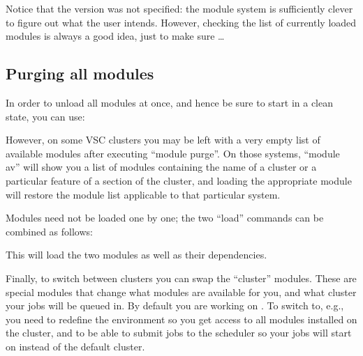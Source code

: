 Notice that the version was not specified: the module system is sufficiently
clever to figure out what the user intends. However, checking the list of
currently loaded modules is always a good idea, just to make sure \ldots

\subsection{Purging all modules}
\label{subsec:purging-modules}

In order to unload all modules at once, and hence be sure to start in a clean
state, you can use:

\begin{prompt}
\end{prompt}

However, on some VSC clusters you may be left with a very empty list of available
modules after executing ``module purge''. On those systems, ``module av'' will show you a list of
modules containing the name of a cluster or a particular feature of a section of
the cluster, and loading the appropriate module will restore the module list
applicable to that particular system.

Modules need not be loaded one by one; the two ``load'' commands can be
combined as follows:

\ifantwerpen
\begin{prompt}
\end{prompt}
\fi
\ifbrussel
\begin{prompt}
\end{prompt}
\fi
\ifgent
\begin{prompt}
\end{prompt}
\fi
\ifleuven
\begin{prompt}
\end{prompt}
\fi

This will load the two modules as well as their dependencies.

\ifgent
Finally, to switch between clusters you can swap the ``cluster'' modules.
These are special modules that change what modules are available for you,
and what cluster your jobs will be queued in.
By default you are working on . To switch to, e.g., \othercluster you need
to redefine the environment so you get access to all modules installed on
the \othercluster cluster, and to be able to submit jobs to the \othercluster scheduler
so your jobs will start on \othercluster instead of the default  cluster.

